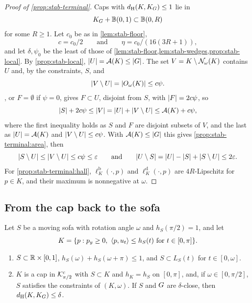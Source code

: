 \begin{proof}[Proof of \cref{prop:stab-terminal}]
Caps with $d_{\mathrm{H}}(K,K_G)\le1$ lie in
\[
  K_G+\mathbb B(0,1)\subset\mathbb B(0,R)
\]
for some $R\ge1$. Let $c_0$ be as in \cref{lem:stab-floor},
\[
  c=c_0/2\qquad\text{and}\qquad\eta=c_0/(16(3R+1)),
\]
and let $\delta,\psi_0$ be the least of those of
\cref{lem:stab-floor,lem:stab-wedges,prop:stab-local}. By
\cref{prop:stab-local}, $\lvert U\rvert=\mathcal{A}(K)\le\lvert G\rvert$. The set
$V=K\setminus\mathcal{N}_\omega(K)$ contains $U$ and, by the constraints, $S$, and
\[
  \lvert V\setminus U\rvert=\lvert O_\omega(K)\rvert\le c\psi.
\]
, or $F=\emptyset$ if $\psi=0$, gives $F\subset U$,
disjoint from $S$, with $\lvert F\rvert=2c\psi$, so
\[
  \lvert S\rvert+2c\psi\le\lvert V\rvert=\lvert U\rvert+\lvert V\setminus U\rvert\le\mathcal{A}(K)+c\psi ,
\]
where the first inequality holds as $S$ and $F$ are disjoint subsets of $V$,
and the last as $\lvert U\rvert=\mathcal{A}(K)$ and $\lvert V\setminus U\rvert\le c\psi$. With
$\mathcal{A}(K)\le\lvert G\rvert$ this gives \ref{prop:stab-terminal:area}, then
\[
  \lvert S\setminus U\rvert\le\lvert V\setminus U\rvert\le c\psi\le\varepsilon\qquad\text{and}\qquad
  \lvert U\setminus S\rvert=\lvert U\rvert-\lvert S\rvert+\lvert S\setminus U\rvert\le2\varepsilon.
\]
For \ref{prop:stab-terminal:hall}, $\ell^{\mathrm b}_K(\cdot,p)$ and
$\ell^{\mathrm d}_K(\cdot,p)$ are $4R$-Lipschitz for $p\in K$, and their
maximum is nonnegative at $\omega$.
\end{proof}

\subsection{From the cap back to the sofa}\label{sec:stab-recovery}

\begin{lemma}\label{lem:stab-sofacap}
Let $S$ be a moving sofa with rotation angle $\omega$ and $h_S(\pi/2)=1$, and
let
\[
  K=\{p:p_y\ge0,\ \langle p,u_t\rangle\le h_S(t)\text{ for }t\in[0,\pi]\}.
\]
\begin{enumerate}[label=(\alph*)]
\item\label{lem:stab-sofacap:sofa} $S\subset\mathbb{R}\times[0,1]$,
$h_S(\omega)+h_S(\omega+\pi)\le1$, and $S\subset L_S(t)$ for
$t\in[0,\omega]$.
\item\label{lem:stab-sofacap:cap} $K$ is a cap in $\mathcal{K}^{\mathrm{c}}_{\pi/2}$ with
$S\subset K$ and $h_K=h_S$ on $[0,\pi]$, and, if $\omega\in[0,\pi/2]$, $S$
satisfies the constraints of $(K,\omega)$. If $S$ and $G$ are
$\delta$-close, then $d_{\mathrm{H}}(K,K_G)\le\delta$.
\end{enumerate}
\end{lemma}

